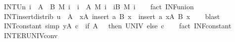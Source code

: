 \begin{isabellebody}
\isanewline
{}\isamarkupfalse%
\ INT{\isacharunderscore}{\kern0pt}Un{\isacharcolon}{\kern0pt}\ {\isachardoublequoteopen}{\isacharparenleft}{\kern0pt}{\isasymInter}i\ {\isasymin}\ A\ {\isasymunion}\ B{\isachardot}{\kern0pt}\ M\ i{\isacharparenright}{\kern0pt}\ {\isacharequal}{\kern0pt}\ {\isacharparenleft}{\kern0pt}{\isasymInter}i\ {\isasymin}\ A{\isachardot}{\kern0pt}\ M\ i{\isacharparenright}{\kern0pt}\ {\isasyminter}\ {\isacharparenleft}{\kern0pt}{\isasymInter}i{\isasymin}B{\isachardot}{\kern0pt}\ M\ i{\isacharparenright}{\kern0pt}{\isachardoublequoteclose}\isanewline
%
\isadelimproof
\ \ %
\endisadelimproof
%
\isatagproof
{}\isamarkupfalse%
\ {\isacharparenleft}{\kern0pt}fact\ INF{\isacharunderscore}{\kern0pt}union{\isacharparenright}{\kern0pt}%
\endisatagproof
{\isafoldproof}%
%
\isadelimproof
\isanewline
%
\endisadelimproof
\isanewline
{}\isamarkupfalse%
\ INT{\isacharunderscore}{\kern0pt}insert{\isacharunderscore}{\kern0pt}distrib{\isacharcolon}{\kern0pt}\ {\isachardoublequoteopen}u\ {\isasymin}\ A\ {\isasymLongrightarrow}\ {\isacharparenleft}{\kern0pt}{\isasymInter}x{\isasymin}A{\isachardot}{\kern0pt}\ insert\ a\ {\isacharparenleft}{\kern0pt}B\ x{\isacharparenright}{\kern0pt}{\isacharparenright}{\kern0pt}\ {\isacharequal}{\kern0pt}\ insert\ a\ {\isacharparenleft}{\kern0pt}{\isasymInter}x{\isasymin}A{\isachardot}{\kern0pt}\ B\ x{\isacharparenright}{\kern0pt}{\isachardoublequoteclose}\isanewline
%
\isadelimproof
\ \ %
\endisadelimproof
%
\isatagproof
{}\isamarkupfalse%
\ blast%
\endisatagproof
{\isafoldproof}%
%
\isadelimproof
\isanewline
%
\endisadelimproof
\isanewline
{}\isamarkupfalse%
\ INT{\isacharunderscore}{\kern0pt}constant\ {\isacharbrackleft}{\kern0pt}simp{\isacharbrackright}{\kern0pt}{\isacharcolon}{\kern0pt}\ {\isachardoublequoteopen}{\isacharparenleft}{\kern0pt}{\isasymInter}y{\isasymin}A{\isachardot}{\kern0pt}\ c{\isacharparenright}{\kern0pt}\ {\isacharequal}{\kern0pt}\ {\isacharparenleft}{\kern0pt}if\ A\ {\isacharequal}{\kern0pt}\ {\isacharbraceleft}{\kern0pt}{\isacharbraceright}{\kern0pt}\ then\ UNIV\ else\ c{\isacharparenright}{\kern0pt}{\isachardoublequoteclose}\isanewline
%
\isadelimproof
\ \ %
\endisadelimproof
%
\isatagproof
{}\isamarkupfalse%
\ {\isacharparenleft}{\kern0pt}fact\ INF{\isacharunderscore}{\kern0pt}constant{\isacharparenright}{\kern0pt}%
\endisatagproof
{\isafoldproof}%
%
\isadelimproof
\isanewline
%
\endisadelimproof
\isanewline
{}\isamarkupfalse%
\ INTER{\isacharunderscore}{\kern0pt}UNIV{\isacharunderscore}{\kern0pt}conv{\isacharcolon}{\kern0pt}\isanewline

\end{isabellebody}
